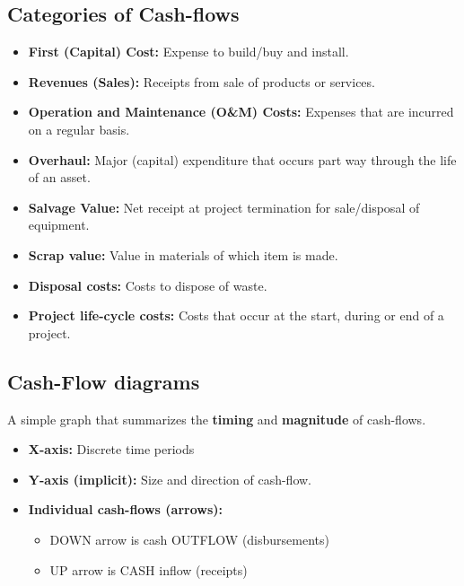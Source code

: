 \subsection{Categories of Cash-flows}
\begin{terminology}
    \begin{itemize}
        \item \textbf{First (Capital) Cost:} Expense to build/buy and install.
        \item \textbf{Revenues (Sales):} Receipts from sale of products or services.
        \item \textbf{Operation and Maintenance (O\&M) Costs:} Expenses that are incurred on a regular basis. 
        \item \textbf{Overhaul:} Major (capital) expenditure that occurs part way through the life of an asset. 
        \item \textbf{Salvage Value:} Net receipt at project termination for sale/disposal of equipment.
        \item \textbf{Scrap value:} Value in materials of which item is made.
        \item \textbf{Disposal costs:} Costs to dispose of waste.
        \item \textbf{Project life-cycle costs:} Costs that occur at the start, during or end of a project. 
    \end{itemize}
\end{terminology}

\subsection{Cash-Flow diagrams}
\begin{definition}
    A simple graph that summarizes the \textbf{timing} and \textbf{magnitude} of cash-flows.
    \begin{itemize}
        \item \textbf{X-axis:} Discrete time periods
        \item \textbf{Y-axis (implicit):} Size and direction of cash-flow.
        \item \textbf{Individual cash-flows (arrows):} 
            \begin{itemize}
                \item DOWN arrow is cash OUTFLOW (disbursements)
                \item UP arrow is CASH inflow (receipts)
            \end{itemize}
    \end{itemize}
\end{definition}


